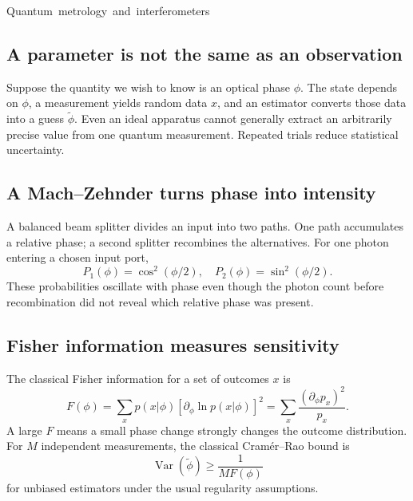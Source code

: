 \unit{Quantum metrology and interferometers}
\subsection{A parameter is not the same as an observation}
Suppose the quantity we wish to know is an
optical phase \(\phi\). The state depends on
\(\phi\), a measurement yields random data
\(x\), and an estimator converts those data
into a guess \(\tilde\phi\).
Even an ideal apparatus cannot generally
extract an arbitrarily precise value from
one quantum measurement. Repeated trials
reduce statistical uncertainty.

\subsection{A Mach--Zehnder turns phase into intensity}
A balanced beam splitter divides an input
into two paths. One path accumulates a
relative phase; a second splitter recombines
the alternatives. For one photon entering
a chosen input port,
\[
\boxed{P_1(\phi)=\cos^2(\phi/2),\quad
P_2(\phi)=\sin^2(\phi/2).}
\]
These probabilities oscillate with phase
even though the photon count before
recombination did not reveal which
relative phase was present.

\begin{center}
\end{center}

\subsection{Fisher information measures sensitivity}
The classical Fisher information for a
set of outcomes \(x\) is
\[
\boxed{F(\phi)=\sum_x
p(x|\phi)[\partial_\phi\ln p(x|\phi)]^2
=\sum_x\frac{(\partial_\phi p_x)^2}{p_x}.}
\]
A large \(F\) means a small phase change
strongly changes the outcome distribution.
For \(M\) independent measurements, the
classical Cram\'er--Rao bound is
\[
\operatorname{Var}(\tilde\phi)
\ge\frac{1}{MF(\phi)}
\]
for unbiased estimators under the usual
regularity assumptions.

